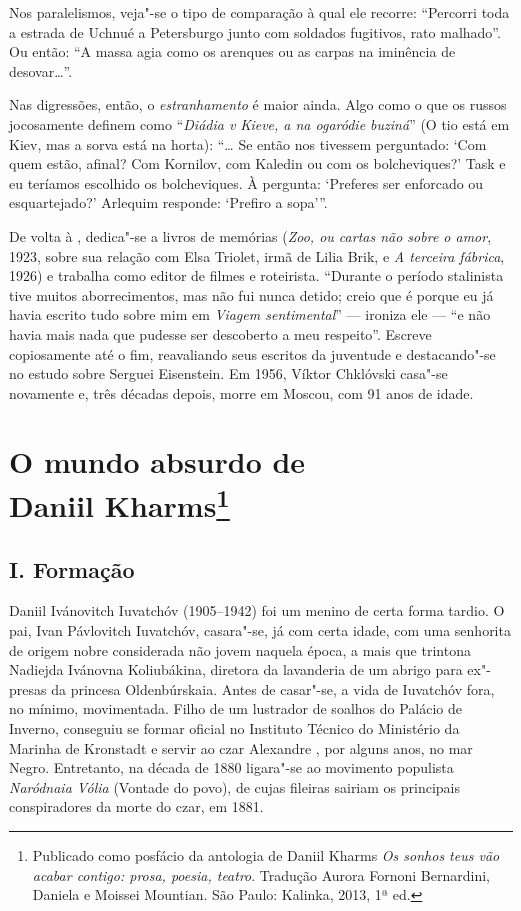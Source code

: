 Nos paralelismos, veja"-se o tipo de comparação à qual ele
recorre: ``Percorri toda a estrada de Uchnué a Petersburgo
junto com soldados fugitivos, rato malhado''. Ou então: ``A
massa agia como os arenques ou as carpas na iminência de
desovar\ldots{}''.

Nas digressões, então, o \emph{estranhamento} é maior ainda. Algo
como o que os russos jocosamente definem como ``\emph{Diádia v
Kieve, a na ogaródie buziná}'' (O tio está em Kiev, mas a sorva
está na horta): ``\ldots{} Se então nos tivessem perguntado: `Com
quem estão, afinal? Com Kornilov, com Kaledin ou com os bolcheviques?'
Task e eu teríamos escolhido os bolcheviques. À pergunta: ‘Preferes
ser enforcado ou esquartejado?’ Arlequim responde: ‘Prefiro a
sopa’''.

De volta à , dedica"-se a livros de memórias
(\emph{Zoo, ou cartas não sobre o amor}, 1923, sobre sua relação
com Elsa Triolet, irmã de Lilia Brik, e \emph{A terceira fábrica}, 1926) e trabalha como
editor de filmes e roteirista. ``Durante o período stalinista
tive muitos aborrecimentos, mas não fui nunca detido; creio
que é porque eu já havia escrito tudo sobre mim em \emph{Viagem
sentimental}'' --- ironiza ele --- ``e não havia mais nada que
pudesse ser descoberto a meu respeito''. Escreve copiosamente
até o fim, reavaliando seus escritos da juventude e destacando"-se
no estudo sobre Serguei Eisenstein. Em 1956, Víktor Chklóvski casa"-se novamente e,
três décadas depois, morre em Moscou, com 91 anos de idade.

\chapter{O mundo absurdo de\\ Daniil Kharms\footnote{Publicado
como posfácio da antologia de Daniil Kharms \emph{Os sonhos teus
vão acabar contigo: prosa, poesia, teatro}. Tradução Aurora
Fornoni Bernardini, Daniela e Moissei Mountian. São Paulo:
Kalinka, 2013, 1ª ed.}}
\label{kharms}

\section{\uppercase{I}. \uppercase{F}ormação}

Daniil Ivánovitch Iuvatchóv (1905--1942) foi um menino de certa
forma tardio. O pai, Ivan Pávlovitch Iuvatchóv, casara"-se, já
com certa idade, com uma senhorita de origem nobre considerada
não jovem naquela época, a mais que trintona Nadiejda Ivánovna
Koliubákina, diretora da lavanderia de um abrigo para ex"-presas
da princesa Oldenbúrskaia. Antes de casar"-se, a vida de Iuvatchóv
fora, no mínimo, movimentada. Filho de um lustrador de soalhos
do Palácio de Inverno, conseguiu se formar oficial no Instituto
Técnico do Ministério da Marinha de Kronstadt e servir ao czar
Alexandre , por alguns anos, no mar Negro. Entretanto,
na década de 1880 ligara"-se ao movimento populista \emph{Naródnaia
Vólia} (Vontade do povo), de cujas fileiras sairiam os principais
conspiradores da morte do czar, em 1881.

